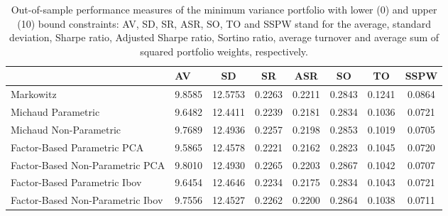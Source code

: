 \begin{table}

\caption{\label{tab:luc_mvp}Out-of-sample performance measures of the minimum variance portfolio with lower (0) and upper (10) bound constraints: AV, SD, SR, ASR, SO, TO and SSPW stand for the average, standard deviation, Sharpe ratio, Adjusted Sharpe ratio, Sortino ratio, average turnover and average sum of squared portfolio weights, respectively.}
\centering
\begin{tabular}[t]{l|l|c|c|c|c|c|c}
\hline
  & AV & SD & SR & ASR & SO & TO & SSPW\\
\hline
Markowitz & 9.8585 & 12.5753 & 0.2263 & 0.2211 & 0.2843 & 0.1241 & 0.0864\\
\hline
Michaud Parametric & 9.6482 & 12.4411 & 0.2239 & 0.2181 & 0.2834 & 0.1036 & 0.0721\\
\hline
Michaud Non-Parametric & 9.7689 & 12.4936 & 0.2257 & 0.2198 & 0.2853 & 0.1019 & 0.0705\\
\hline
Factor-Based Parametric PCA & 9.5865 & 12.4578 & 0.2221 & 0.2162 & 0.2823 & 0.1045 & 0.0720\\
\hline
Factor-Based Non-Parametric PCA & 9.8010 & 12.4930 & 0.2265 & 0.2203 & 0.2867 & 0.1042 & 0.0707\\
\hline
Factor-Based Parametric Ibov & 9.6454 & 12.4646 & 0.2234 & 0.2175 & 0.2834 & 0.1043 & 0.0721\\
\hline
Factor-Based Non-Parametric Ibov & 9.7556 & 12.4527 & 0.2262 & 0.2200 & 0.2864 & 0.1038 & 0.0711\\
\hline
\end{tabular}
\end{table}
